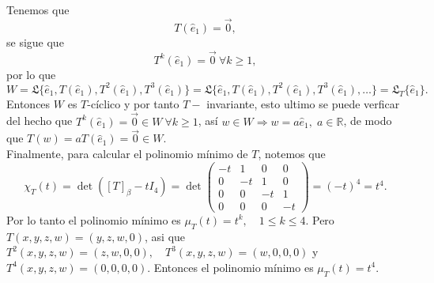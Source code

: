 \documentclass[11pt]{article}
\newcommand{\R}{\mathbb{R}}
\begin{document}
\begin{Solucion}
  Tenemos que \[T(\hat{e}_1)=\vec{0},\] se sigue que \[T^k(\hat{e}_1)=\vec{0}\ \forall k\geq 1,\] por lo que
  \[W=\mathfrak{L}\{\hat{e}_1,T(\hat{e}_1),T^2(\hat{e}_1),T^3(\hat{e}_1)\}=
  \mathfrak{L} \{\hat{e}_1,T(\hat{e}_1),T^2(\hat{e}_1),T^3(\hat{e}_1),\dots\}=\mathfrak{L}_T{ \{\hat{e}_1\}}. \]
  Entonces \( W \) es \( T \)-cíclico y por tanto \(T-\) invariante, esto ultimo se puede verficar del hecho que 
  \( T^k(\hat{e}_1)=\vec{0} \in W\ \forall k\geq 1\), así \(w\in W \Rightarrow w=a\hat{e}_1, \; a\in \R\), de modo que
  \(T(w)=aT(\hat{e}_1)=\vec{0}\in W\).\\
  Finalmente, para calcular el polinomio mínimo de \( T \), notemos que
  \[\chi_T(t)=\det([T]_{\beta}-tI_4)=\det\begin{pmatrix} -t & 1 & 0 & 0 \\ 0 & -t & 1 & 0 \\ 0 & 0 & -t & 1 \\ 0 & 0 & 0 & -t \end{pmatrix}=(-t)^4=t^4.\]
  Por lo tanto el polinomio mínimo es \( \mu_T(t)=t^k,\quad 1\leq k \leq 4 \). Pero \(T(x,y,z,w)=(y,z,w,0)\), asi que \(T^2(x,y,z,w)=(z,w,0,0),\quad T^3(x,y,z,w)=(w,0,0,0)\) y
  \(T^4(x,y,z,w)=(0,0,0,0)\). Entonces el polinomio mínimo es \( \mu_T(t)=t^4 \).

\end{Solucion}
\end{document}
